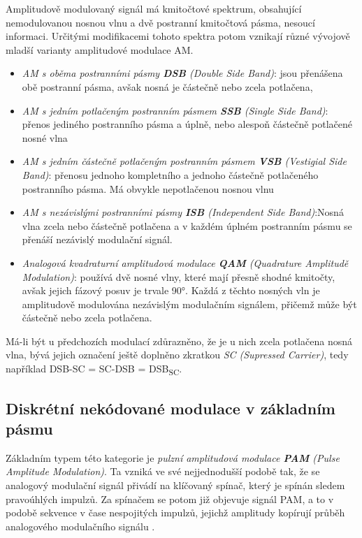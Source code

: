       Amplitudově modulovaný signál má kmitočtové spektrum, obsahující nemodulovanou nosnou vlnu a dvě 
      postranní kmitočtová pásma, nesoucí informaci. Určitými modifikacemi tohoto spektra potom vznikají 
      různé vývojově mladší varianty amplitudové modulace AM. 
      \begin{itemize}
        \item \emph{AM s oběma postranními pásmy \textbf{DSB} (Double Side Band)}: jsou přenášena obě 
               postranní pásma, avšak nosná je částečně nebo zcela potlačena,
        \item \emph{AM s jedním potlačeným postranním pásmem \textbf{SSB} (Single Side Band)}: přenos 
               jediného postranního pásma a úplně, nebo alespoň částečně potlačené nosné vlna
        \item \emph{AM s jedním částečně potlačeným postranním pásmem \textbf{VSB} (Vestigial Side Band)}: 
               přenosu jednoho kompletního a jednoho částečně potlačeného postranního pásma. Má obvykle 
               nepotlačenou nosnou vlnu 
        \item \emph{AM s nezávislými postranními pásmy \textbf{ISB} (Independent Side Band)}:Nosná vlna   
               zcela nebo částečně potlačena a v každém úplném postranním pásmu se přenáší nezávislý 
               modulační signál.
        \item \emph{Analogová kvadraturní amplitudová modulace \textbf{QAM} (Quadrature Amplitudě 
               Modulation)}: používá dvě nosné vlny, které mají přesně shodné kmitočty, avšak jejich fázový 
               posuv je trvale 90°. Každá z těchto nosných vln je amplitudově modulována nezávislým 
               modulačním signálem, přičemž může být částečně nebo zcela potlačena.
      \end{itemize}
      
      Má-li být u předchozích modulací zdůrazněno, že je u nich zcela potlačena nosná vlna, bývá jejich 
      označení ještě doplněno zkratkou \emph{SC (Supressed Carrier)}, tedy například DSB-SC = SC-DSB = 
      DSB\textsubscript{SC}.
      
    \subsection{Diskrétní nekódované modulace v základním pásmu}
      Základním typem této kategorie je \emph{pulzní amplitudová modulace \textbf{PAM} (Pulse Amplitude 
      Modulation)}. Ta vzniká ve své nejjednodušší podobě tak, že se analogový modulační signál přivádí na 
      klíčovaný spínač, který je spínán sledem pravoúhlých impulzů. Za spínačem se potom již objevuje signál 
      PAM, a to v podobě sekvence v čase nespojitých impulzů, jejichž amplitudy kopírují průběh analogového 
      modulačního signálu \cite[s.~84]{ZaludRA}.
      
